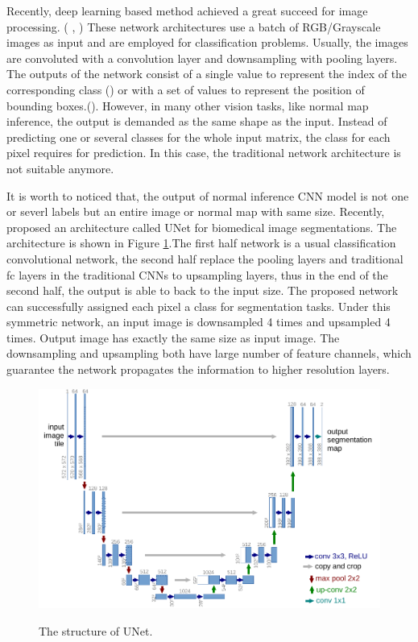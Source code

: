 Recently, deep learning based method achieved a great succeed for image processing. ( \cite{yolov3}, \cite{efficientDet}) These network architectures use a batch of RGB/Grayscale images as input and are employed for classification problems. Usually, the images are convoluted with a convolution layer and downsampling with pooling layers. The outputs of the network consist of a single value to represent the index of the corresponding class (\cite{efficientDet}) or with a set of values to represent the position of bounding boxes.(\cite{yolov3}). However, in many other vision tasks, like normal map inference, the output is demanded as the same shape as the input. Instead of predicting one or several classes for the whole input matrix, the class for each pixel requires for prediction. In this case, the traditional network architecture is not suitable anymore.

It is worth to noticed that, the output of normal inference CNN model is not one or severl labels but an entire image or normal map with same size. 
Recently,\cite{unet} proposed an architecture called UNet for biomedical image segmentations. The architecture is shown in Figure \ref{fig:u-net}.The first half network is a usual classification convolutional network, the second half replace the pooling layers and traditional fc layers in the traditional CNNs to upsampling layers, thus in the end of the second half, the output is able to back to the input size. The proposed network can successfully assigned each pixel a class for segmentation tasks. Under this symmetric network, an input image is downsampled 4 times and upsampled 4 times. Output image has exactly the same size as input image. The downsampling and upsampling both have large number of feature channels, which guarantee the network propagates the information to higher resolution layers.

\begin{figure}[th]
	\centering
	\includegraphics[width=.8\textwidth]{./Figures/u-net-illustration-correct-scale2.pdf}
	\label{fig:u-net}
	\caption{The structure of UNet. \cite{unet}}
\end{figure}


